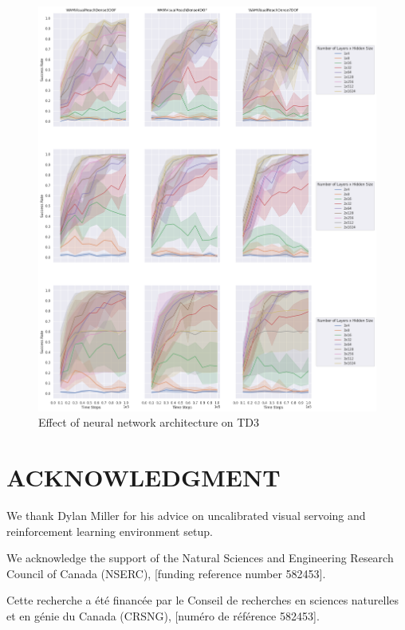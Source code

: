 \documentclass[letterpaper, 10 pt, conference]{ieeeconf}  %
\begin{document}
\begin{figure}[thpb]
    \centering
    \includegraphics[width=\linewidth]{successes.arch.timesteps.png}
    \caption{Effect of neural network architecture on TD3}
    \label{fig:arch}
\end{figure}

\section*{ACKNOWLEDGMENT}

We thank Dylan Miller for his advice on uncalibrated visual
servoing and reinforcement learning environment setup.

We acknowledge the support of the Natural Sciences and Engineering Research
Council of Canada (NSERC), [funding reference number 582453].

Cette recherche a été financée par le Conseil de recherches en sciences
naturelles et en génie du Canada (CRSNG), [numéro de référence 582453].



\end{document}
